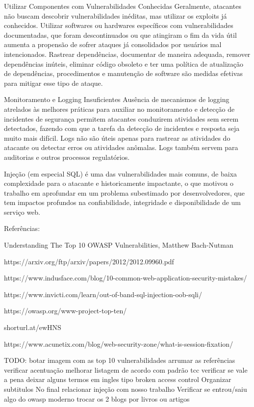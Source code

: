 Utilizar Componentes com Vulnerabilidades Conhecidas
Geralmente, atacantes não buscam descobrir vulnerabilidades inéditas, mas utilizar os exploits já conhecidos.
Utilizar softwares ou hardwares específicos com vulnerabilidades documentadas, que foram descontinuados ou que atingiram o fim da vida útil aumenta a propensão de sofrer ataques já consolidados por usuários mal intencionados.
Rastrear dependências, documentar de maneira adequada, remover dependências inúteis, eliminar código obsoleto e ter uma política de atualização de dependências, procedimentos e manutenção de software são medidas efetivas para mitigar esse tipo de ataque.

Monitoramento e Logging Insuficientes
Ausência de mecanismos de logging atrelados às melhores práticas para auxiliar no monitoramento e detecção de incidentes de segurança permitem atacantes conduzirem atividades sem serem detectados, fazendo com que a tarefa da detecção de incidentes e resposta seja muito mais difícil. Logs não são úteis apenas para rastrear as atividades do atacante ou detectar erros ou atividades anômalas. Logs também servem para auditorias e outros processos regulatórios.

Injeção (em especial SQL) é uma das vulnerabilidades mais comuns, de baixa complexidade para o atacante e historicamente impactante, o que motivou o trabalho em aprofundar em um problema subestimado por desenvolvedores, que tem impactos profundos na confiabilidade, integridade e disponibilidade de um serviço web.

Referências:

Understanding The Top 10 OWASP Vulnerabilities, Matthew Bach-Nutman

https://arxiv.org/ftp/arxiv/papers/2012/2012.09960.pdf

https://www.indusface.com/blog/10-common-web-application-security-mistakes/

https://www.invicti.com/learn/out-of-band-sql-injection-oob-sqli/

https://owasp.org/www-project-top-ten/

shorturl.at/ewHNS

https://www.acunetix.com/blog/web-security-zone/what-is-session-fixation/

TODO:
botar imagem com as top 10 vulnerabilidades
arrumar as referências
verificar acentuação
melhorar listagem de acordo com padrão tcc
verificar se vale a pena deixar alguns termos em ingles tipo broken access control
Organizar subtitulos
No final relacionar injeção com nosso trabalho
Verificar se entrou/saiu algo do owasp moderno
trocar os 2 blogs por livros ou artigos



